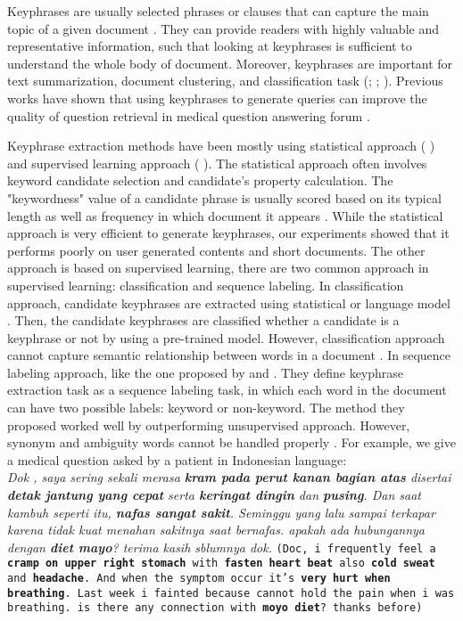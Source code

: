 \iffalse
Keyphrases are usually selected phrases or clauses that can capture the main topic of a given document \cite{turney2000learning}. They can provide readers with highly valuable and representative information, such that looking at keyphrases is sufficient to understand the whole body of document. Moreover, keyphrases are important for text summarization, document clustering, and classification task (\cite{classDocumentEkp1}; \cite{qaEkp}; \cite{gong2009improving}). Previous works have shown that using keyphrases to generate queries can improve the quality of question retrieval in medical question answering forum \cite{cao2010automatically}.


Keyphrase extraction methods have been mostly using statistical approach (\cite{sparck1972statistical} \cite{zhang2007comparative} \cite{rake} \cite{mihalcea2004textrank}) and supervised learning approach (\cite{witten1999kea} \cite{medelyan2009human} \cite{marujoMAUI}). The statistical approach often involves keyword candidate selection and candidate's property calculation. The "keywordness" value of a candidate phrase is usually scored based on its typical length as well as frequency in which document it appears \cite{rake}. While the statistical approach is very efficient to generate keyphrases, our experiments showed that it performs poorly on user generated contents and short documents. The other approach is based on supervised learning, there are two common approach in supervised learning: classification and sequence labeling. In classification approach, candidate keyphrases are extracted using statistical \cite{sparck1972statistical} or language model \cite{ekpNeuralNetworks}. Then, the candidate keyphrases are classified whether a candidate is a keyphrase or not by using a pre-trained model. However, classification approach cannot capture semantic relationship between words in a document \cite{surveyPopulerTerbaruEkp}.  In sequence labeling approach,  like the one proposed by \cite{cao2010automatically} and \cite{zhang2008automatic}. They define keyphrase extraction task as a sequence labeling task, in which each word in the document can have two possible labels: keyword or non-keyword. The method they proposed worked well by outperforming unsupervised approach. However, synonym and ambiguity words cannot be handled properly \cite{zhang2008automatic}. For example, we give a medical question asked by a patient in Indonesian language:
	\textit{\\Dok , saya sering sekali merasa \textbf{\emph{kram pada perut kanan bagian atas}} disertai \textbf{detak jantung yang cepat} serta \textbf{keringat dingin} dan \textbf{pusing}. Dan saat kambuh seperti itu, \textbf{nafas sangat sakit}. Seminggu yang lalu sampai terkapar karena tidak kuat menahan sakitnya saat bernafas. apakah ada hubungannya dengan \textbf{diet mayo}? terima kasih sblumnya dok.}
	\texttt{(Doc, i frequently feel a \textbf{cramp on upper right stomach} with \textbf{fasten heart beat} also \textbf{cold sweat} and \textbf{headache}. And when the symptom occur it's \textbf{very hurt when breathing}. Last week i fainted because cannot hold the pain when i was breathing. is there any connection with \textbf{moyo diet}? thanks before)}

